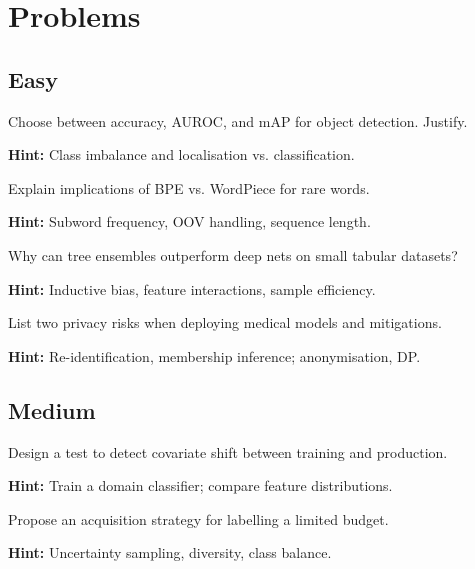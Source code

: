 
\section*{Problems}

\subsection*{Easy}

\begin{problem}
Choose between accuracy, AUROC, and mAP for object detection. Justify.

\textbf{Hint:} Class imbalance and localisation vs. classification.
\end{problem}

\begin{problem}
Explain implications of BPE vs. WordPiece for rare words.

\textbf{Hint:} Subword frequency, OOV handling, sequence length.
\end{problem}

\begin{problem}
Why can tree ensembles outperform deep nets on small tabular datasets?

\textbf{Hint:} Inductive bias, feature interactions, sample efficiency.
\end{problem}

\begin{problem}
List two privacy risks when deploying medical models and mitigations.

\textbf{Hint:} Re-identification, membership inference; anonymisation, DP.
\end{problem}

\subsection*{Medium}

\begin{problem}
Design a test to detect covariate shift between training and production.

\textbf{Hint:} Train a domain classifier; compare feature distributions.
\end{problem}

\begin{problem}
Propose an acquisition strategy for labelling a limited budget.

\textbf{Hint:} Uncertainty sampling, diversity, class balance.
\end{problem}

